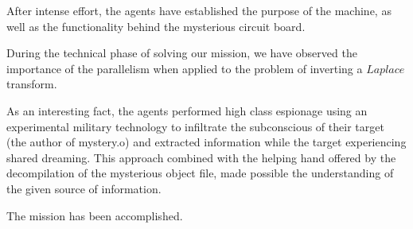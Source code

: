 After intense effort, the agents have established the purpose of the machine, as well as the functionality behind the mysterious circuit board. 

During the technical phase of solving our mission, we have observed the importance of the parallelism when applied to the problem of inverting a $Laplace$ transform.


As an interesting fact,  the agents performed high class espionage using an experimental military technology to infiltrate the subconscious of their target (the author of mystery.o) and extracted information while the target experiencing shared dreaming. This approach combined with the helping hand offered by the decompilation of the mysterious object file, made possible the understanding of the given source of information.
 
The mission has been accomplished. 



